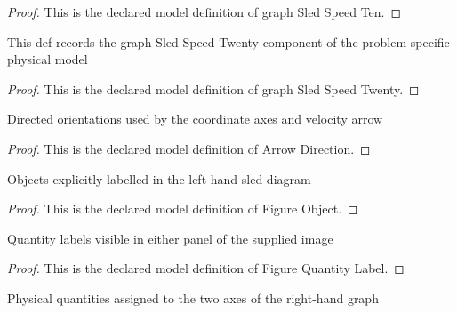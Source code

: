\begin{proof}
  This is the declared model definition of graph Sled Speed Ten.
\end{proof}
\begin{definition}
  \label{def:physics:phyx-mini-0749:phyxminiproblems-problemphyxmini0749-graphsledspeedtwenty}
  This def records the graph Sled Speed Twenty component of the problem-specific physical model
\end{definition}
\begin{proof}
  This is the declared model definition of graph Sled Speed Twenty.
\end{proof}
\begin{definition}
  \label{def:physics:phyx-mini-0749:phyxminiproblems-problemphyxmini0749-arrowdirection}
  Directed orientations used by the coordinate axes and velocity arrow
\end{definition}
\begin{proof}
  This is the declared model definition of Arrow Direction.
\end{proof}
\begin{definition}
  \label{def:physics:phyx-mini-0749:phyxminiproblems-problemphyxmini0749-figureobject}
  Objects explicitly labelled in the left-hand sled diagram
\end{definition}
\begin{proof}
  This is the declared model definition of Figure Object.
\end{proof}
\begin{definition}
  \label{def:physics:phyx-mini-0749:phyxminiproblems-problemphyxmini0749-figurequantitylabel}
  Quantity labels visible in either panel of the supplied image
\end{definition}
\begin{proof}
  This is the declared model definition of Figure Quantity Label.
\end{proof}
\begin{definition}
  \label{def:physics:phyx-mini-0749:phyxminiproblems-problemphyxmini0749-graphaxisquantity}
  Physical quantities assigned to the two axes of the right-hand graph
\end{definition}
